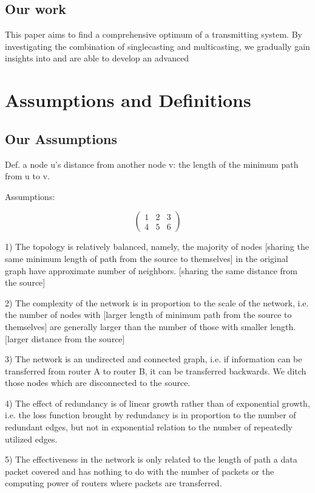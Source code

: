 \documentclass{mcmthesis}
\begin{document}
\subsection{Our work}
This paper aims to find a comprehensive optimum of  a transmitting system. By
investigating the combination of singlecasting and multicasting, we gradually gain
insights into  and are able to develop an advanced 

\section{Assumptions and Definitions}
\subsection{Our Assumptions}

Def. a node u's distance from another node v: the length of the minimum path from u to v.

Assumptions:

\[
 \begin{pmatrix}
	 1 & 2 & 3\\ 
4 & 5 &6
	\end{pmatrix}
\]

1) The topology is relatively balanced, namely, the majority of nodes [sharing the same minimum length of path from the source to themselves] in the original graph have approximate number of neighbors.
[sharing the same distance from the source]

2) The complexity of the network is in proportion to the scale of the network, i.e. the number of nodes with [larger length of minimum path from the source to themselves] are generally larger than the number of those with smaller length.
[larger distance from the source]

3) The network is an undirected and connected graph, i.e. if information can be transferred from router A to router B, it can be transferred backwards. We ditch those nodes which are disconnected to the source.

4) The effect of redundancy is of linear growth rather than of exponential growth, i.e. the loss function brought by redundancy is in proportion to the number of redundant edges, but not in exponential relation to the number of repeatedly utilized edges.

5) The effectiveness in the network is only related to the length of path a data packet covered and has nothing to do with the number of packets or the computing power of routers where packets are transferred.
\end{document}
